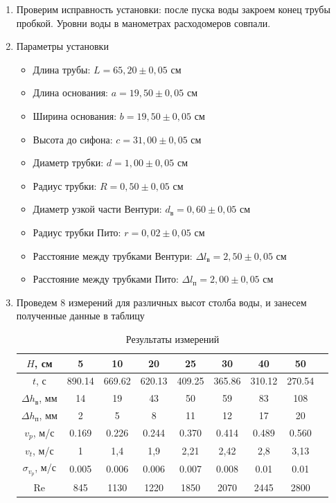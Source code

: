 \documentclass[12pt]{article}
\begin{document}
\begin{enumerate}
\item Проверим исправность установки: после пуска воды закроем конец трубы пробкой. Уровни воды в манометрах расходомеров совпали.

\item Параметры установки
\begin{itemize}
    \item Длина трубы: $L = 65,20 \pm 0,05$ см
    \item Длина основания:  $a = 19,50 \pm 0,05$ см
    \item Ширина основания: $b = 19,50 \pm 0,05$ см
    \item Высота до сифона: $c = 31,00 \pm 0,05$ см
    \item Диаметр трубки: $d = 1,00 \pm 0,05$ см
    \item Радиус трубки:  $R = 0,50 \pm 0,05$ см
    \item Диаметр узкой части Вентури: $d_{\text{в}} = 0,60 \pm 0,05$ см
    \item Радиус трубки Пито: $r = 0,02 \pm 0,05$ см
    \item Расстояние между трубками Вентури: $\Delta l_{\text{в}} = 2,50 \pm 0,05$ см
    \item Расстояние между трубками Пито: $\Delta l_{\text{п}} = 2,00 \pm 0,05$ см
\end{itemize}

\item Проведем 8 измерений для различных высот столба воды, и занесем полученные данные в таблицу

\begin{table}[H]
\centering
\caption{Результаты измерений}
\label{tab:results}
\begin{tabular}{|c|c|c|c|c|c|c|c|c|}
\hline
$H$, см              & 5      & 10     & 20      & 25     & 30     & 40     & 50\\
\hline
$t$, с               & 890.14 & 669.62 &  620.13 & 409.25 & 365.86 & 310.12 & 270.54\\
\hline
$\Delta h_{\text{в}}$, мм   & 14     & 19     & 43      & 50     & 59     & 83     & 108\\
\hline
$\Delta h_{\text{п}}$, мм   & 2      & 5      & 8       & 11     & 12     & 17     & 20 \\
\hline
$v_p$, м/с           & 0.169  & 0.226  & 0.244   & 0.370  & 0.414  & 0.489  & 0.560\\
\hline
$v_t$, м/с           & 1      & 1,4    & 1,9     & 2,21   & 2,42   & 2,8    & 3,13\\
\hline
$\sigma_{v_p}$, м/с  & 0.005  & 0.006  & 0.006   & 0.007  & 0.008  & 0.01   & 0.01\\
\hline
Re                   & 845    & 1130   & 1220    & 1850   & 2070   & 2445   & 2800\\
\hline
\end{tabular}
\end{table}


\end{enumerate}
\end{document}
